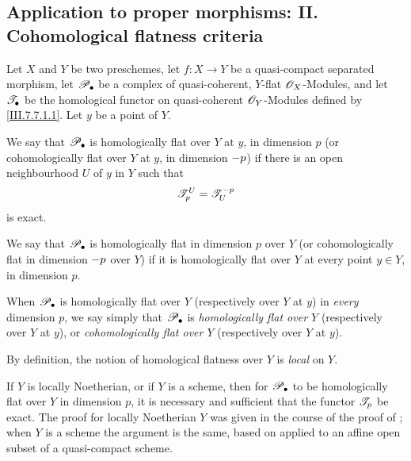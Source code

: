 \subsection{Application to proper morphisms: II. Cohomological flatness criteria}
\label{subsection:III.7.8}
\label{III.7.8}

\begin{definition}[7.8.1]
\label{III.7.8.1}
Let $X$ and $Y$ be two preschemes, let $f:X\to Y$ be a
quasi-compact separated morphism, let $\mathscr{P}_\bullet$ be a
complex of quasi-coherent, $Y$-flat $\mathscr{O}_X$-Modules, and
let $\mathscr{T}_\bullet$ be the homological functor on
quasi-coherent $\mathscr{O}_Y$-Modules defined by
\eqref{III.7.7.1.1}.  Let $y$ be a point of $Y$.

We say that $\mathscr{P}_\bullet$ is homologically flat over
$Y$ at $y$, in dimension $p$ \textup{(or} cohomologically flat
over $Y$ at $y$, in dimension $- p$) if there is an open
neighbourhood $U$ of $y$ in $Y$ such that
\[
  \mathscr{T}_p^U=\mathscr{T}^{-p}_U
\]
is exact.

We say that $\mathscr{P}_\bullet$ is homologically flat in
dimension $p$ over $Y$ \textup{(or} cohomologically flat in
dimension $- p$ over $Y$) if it is homologically flat over
$Y$ at every point $y\in Y$, in dimension $p$.

\upshape When $\mathscr{P}_\bullet$ is homologically flat over $Y$
(respectively over $Y$ at $y$) in \emph{every} dimension
$p$, we say simply that $\mathscr{P}_\bullet$ is
\emph{homologically flat over $Y$} (respectively over $Y$ at
$y$), or \emph{cohomologically flat over $Y$} (respectively
over $Y$ at $y$).
\end{definition}

\begin{env}[7.8.2]
\label{III.7.8.2}
By definition, the notion of homological flatness over $Y$
is \emph{local} on $Y$.

If $Y$ is locally Noetherian, or if $Y$ is a scheme, then
for $\mathscr{P}_\bullet$ to be homologically flat over $Y$ in
dimension $p$, it is necessary and sufficient that the
functor $\mathscr{T}_p$ be exact.  The proof for locally
Noetherian $Y$ was given in the course of the proof of
; when $Y$ is a scheme the argument is the
same, based on  applied to an affine open
subset of a quasi-compact scheme.
\end{env}

